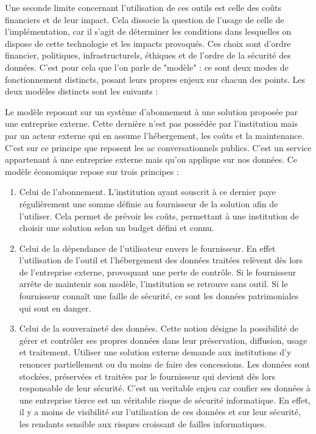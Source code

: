 Une seconde limite concernant l'utilisation de ces outils est celle des coûts financiers et de leur impact. Cela dissocie la question de l'usage de celle de l'implémentation, car il s'agit de déterminer les conditions dans lesquelles on dispose de cette technologie et les impacts provoqués. Ces choix sont d'ordre financier, politiques, infrastructurels, éthiques et de l'ordre de la sécurité des données. C'est pour cela que l'on parle de "modèle" : ce sont deux modes de fonctionnement distincts, posant leurs propres enjeux sur chacun des points. Les deux modèles distincts sont les suivants : \newline

Le modèle reposant sur un système d'abonnement à une solution proposée par une entreprise externe. Cette dernière n'est pas possédée par l'institution mais par un acteur externe qui en assume l'hébergement, les coûts et la maintenance. C'est sur ce principe que reposent les \gls{ac} conversationnels publics. C'est un service appartenant à une entreprise externe mais qu'on applique sur nos données. Ce modèle économique repose sur trois principes : 

\begin{enumerate}
\item Celui de l'abonnement. L'institution ayant souscrit à ce dernier paye régulièrement une somme définie au fournisseur de la solution afin de l'utiliser. Cela permet de prévoir les coûts, permettant à une institution de choisir une solution selon un budget défini et connu.

\item Celui de la dépendance de l'utilisateur envers le fournisseur. En effet l'utilisation de l'outil et l'hébergement des données traitées relèvent dès lors de l'entreprise externe, provoquant une perte de contrôle. Si le fournisseur arrête de maintenir son modèle, l'institution se retrouve sans outil. Si le fournisseur connaît une faille de sécurité, ce sont les données patrimoniales qui sont en danger. 

\item Celui de la souveraineté des données. Cette notion désigne la possibilité de gérer et contrôler ses propres données dans leur préservation, diffusion, usage et traitement. Utiliser une solution externe demande aux institutions d'y renoncer partiellement ou du moins de faire des concessions. Les données sont stockées, préservées et traitées par le fournisseur qui devient dès lors responsable de leur sécurité. C'est un veritable enjeu car confier ses données à une entreprise tierce est un véritable risque de sécurité informatique. En effet, il y a moins de visibilité sur l'utilisation de ces données et sur leur sécurité, les rendants sensible aux risques croissant de failles informatiques.
\end{enumerate}

